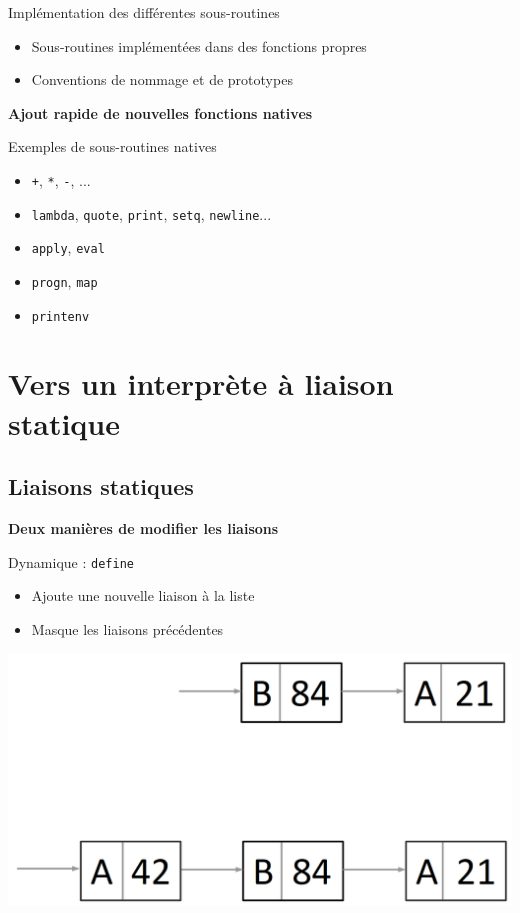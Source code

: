 \documentclass[info]{ensrennesbeamer}
\begin{document}
\begin{frame}
	\begin{block}{Implémentation des différentes sous-routines }
		\begin{itemize}
			\item Sous-routines implémentées dans des fonctions propres
			\item Conventions de nommage et de prototypes
		\end{itemize}
		\textbf{Ajout rapide de nouvelles fonctions natives}
	\end{block}

	\begin{exampleblock}{Exemples de sous-routines natives}
		\begin{itemize}
			\item \lstinline[][+[, \lstinline[][*[, \lstinline[][-[, ...
			\item \lstinline[][lambda[, \lstinline[][quote[, \lstinline[][print[, \lstinline[][setq[, \lstinline[][newline[...
			\item \lstinline[][apply[, \lstinline[][eval[
			\item \lstinline[][progn[, \lstinline[][map[
			\item \lstinline[][printenv[
		\end{itemize}
	\end{exampleblock}
\end{frame}

\section{Vers un interprète à liaison statique}
\subsection{Liaisons statiques}

\begin{frame}
	\textbf{Deux manières de modifier les liaisons}
		\begin{block}{Dynamique : \lstinline[][define[}
			\begin{itemize}
				\item Ajoute une nouvelle liaison à la liste
				\item Masque les liaisons précédentes
			\end{itemize}			
		\end{block}
	\centering
	\includegraphics[height=0.5\textheight]{liaisons_statiques.png}
	
\end{frame}
\end{document}
